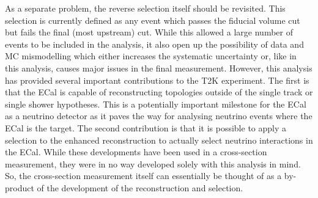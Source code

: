 \newline
\newline
As a separate problem, the reverse selection itself should be revisited.  This selection is currently defined as any event which passes the fiducial volume cut but fails the final (most upstream) cut.  While this allowed a large number of events to be included in the analysis, it also open up the possibility of data and MC mismodelling which either increases the systematic uncertainty or, like in this analysis, causes major issues in the final measurement.
\newline
\newline
However, this analysis has provided several important contributions to the T2K experiment.  The first is that the ECal is capable of reconstructing topologies outside of the single track or single shower hypotheses.  This is a potentially important milestone for the ECal as a neutrino detector as it paves the way for analysing neutrino events where the ECal is the target.  The second contribution is that it is possible to apply a selection to the enhanced reconstruction to actually select neutrino interactions in the ECal.  While these developments have been used in a cross-section measurement, they were in no way developed solely with this analysis in mind.  So, the cross-section measurement itself can essentially be thought of as a by-product of the development of the reconstruction and selection.

